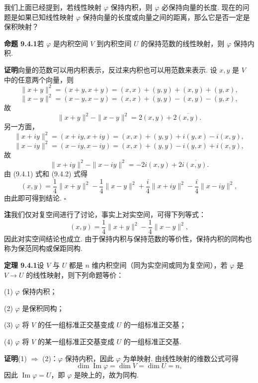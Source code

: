 \documentclass[UTF8, 12pt, fontset=fandol, oneside]{ctexart}
\begin{document}
我们上面已经提到，若线性映射 $\varphi$ 保持内积，则 $\varphi$ 必保持向量的长度. 现在的问题是如果已知线性映射 $\varphi$ 保持向量的长度或向量之间的距离，那么它是否一定是保积映射？

\noindent\textbf{命题 9.4.1}\quad 若 $\varphi$ 是内积空间 $V$ 到内积空间 $U$ 的保持范数的线性映射，则 $\varphi$ 保持内积.

\noindent\textbf{证明}\quad 向量的范数可以用内积表示，反过来内积也可以用范数来表示. 设 $x,y$ 是 $V$ 中的任意两个向量，则
\[
  \|x+y\|^2=(x+y,x+y)=(x,x)+(y,y)+(x,y)+(y,x),
\]
\[
  \|x-y\|^2=(x-y,x-y)=(x,x)+(y,y)-(x,y)-(y,x),
\]
故
\begin{equation}
  \|x+y\|^2-\|x-y\|^2=2(x,y)+2\overline{(x,y)}.
  \tag{9.4.1}
\end{equation}
另一方面，
\[
  \|x+iy\|^2=(x+iy,x+iy)=(x,x)+(y,y)+i(y,x)-i(x,y),
\]
\[
  \|x-iy\|^2=(x-iy,x-iy)=(x,x)+(y,y)-i(y,x)+i(x,y),
\]
故
\begin{equation}
  \|x+iy\|^2-\|x-iy\|^2=-2i(x,y)+2i\overline{(x,y)}.
  \tag{9.4.2}
\end{equation}
由 (9.4.1) 式和 (9.4.2) 式得
\begin{equation}
  (x,y)=\frac14\|x+y\|^2-\frac14\|x-y\|^2
  +\frac i4\|x+iy\|^2-\frac i4\|x-iy\|^2,
  \tag{9.4.3}
\end{equation}
由此即可得到结论. $\square$

\noindent\textbf{注}\quad 我们仅对复空间进行了讨论，事实上对实空间，可得下列等式：
\begin{equation}
  (x,y)=\frac14\|x+y\|^2-\frac14\|x-y\|^2,
  \tag{9.4.4}
\end{equation}
因此对实空间结论也成立. 由于保持内积与保持范数的等价性，保持内积的同构也称为保范同构或保距同构.

\noindent\textbf{定理 9.4.1}\quad 设 $V$ 与 $U$ 都是 $n$ 维内积空间（同为实空间或同为复空间），若 $\varphi$ 是 $V\to U$ 的线性映射，则下列命题等价：

(1) $\varphi$ 保持内积；

(2) $\varphi$ 是保积同构；

(3) $\varphi$ 将 $V$ 的任一组标准正交基变成 $U$ 的一组标准正交基；

(4) $\varphi$ 将 $V$ 的某一组标准正交基变成 $U$ 的一组标准正交基.

\noindent\textbf{证明}\quad (1) $\Rightarrow$ (2)：$\varphi$ 保持内积，因此 $\varphi$ 为单映射. 由线性映射的维数公式可得
\[
  \dim\operatorname{Im}\varphi=\dim V=\dim U=n,
\]
因此 $\operatorname{Im}\varphi=U$，即 $\varphi$ 是映上的，故为同构.
\end{document}
